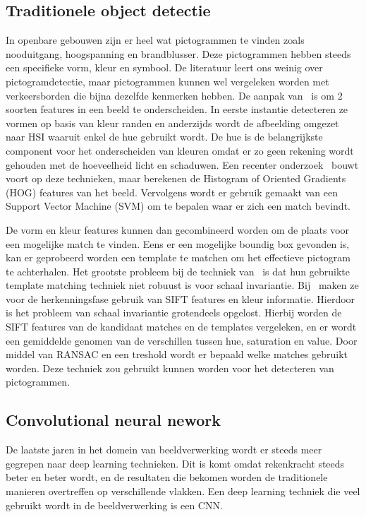         \subsection{Traditionele object detectie}
            In openbare gebouwen zijn er heel wat pictogrammen te vinden zoals nooduitgang, hoogspanning en brandblusser. Deze pictogrammen hebben steeds een specifieke vorm, kleur en symbool.
            De literatuur leert ons weinig over pictogramdetectie, maar pictogrammen kunnen wel vergeleken worden met verkeersborden die bijna dezelfde kenmerken hebben.
            De aanpak van~\cite{Fang2003} is om 2 soorten features in een beeld te onderscheiden. In eerste instantie detecteren ze vormen op basis van kleur randen en anderzijds wordt de
            afbeelding omgezet naar HSI waaruit enkel de hue gebruikt wordt. De hue is de belangrijkste component voor het onderscheiden van kleuren omdat er zo geen rekening wordt gehouden
            met de hoeveelheid licht en schaduwen.
            Een recenter onderzoek~\cite{Zabihi2017} bouwt voort op deze technieken,
            maar berekenen de Histogram of Oriented Gradients (HOG) features van het beeld. Vervolgens wordt er gebruik gemaakt van een Support Vector Machine (SVM) om te bepalen waar er zich een match bevindt.

            De vorm en kleur features kunnen dan gecombineerd worden om de plaats voor een mogelijke match te vinden. Eens er een mogelijke boundig box gevonden is,
            kan er geprobeerd worden een template te matchen om het effectieve pictogram te achterhalen. Het grootste probleem bij de techniek van~\cite{Fang2003} is
            dat hun gebruikte template matching techniek niet robuust is voor schaal invariantie.
            Bij~\cite{Zabihi2017} maken ze voor de herkenningsfase gebruik van SIFT\cite{Lowe1999} features en kleur informatie.
            Hierdoor is het probleem van schaal invariantie grotendeels opgelost.
            Hierbij worden de SIFT features van de kandidaat matches en de templates vergeleken, en er wordt een gemiddelde genomen van de verschillen tussen hue, saturation en value.
            Door middel van RANSAC en een treshold wordt er bepaald welke matches gebruikt worden. Deze techniek zou gebruikt kunnen worden voor het detecteren van pictogrammen.

        
        \subsection{Convolutional neural nework}
            De laatste jaren in het domein van beeldverwerking wordt er steeds meer gegrepen naar deep learning technieken. Dit is komt omdat rekenkracht steeds beter en beter wordt, en de resultaten die bekomen worden
            de traditionele manieren overtreffen op verschillende vlakken. Een deep learning techniek die veel gebruikt wordt in de beeldverwerking is een CNN.

